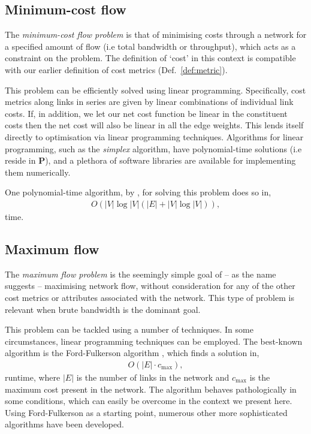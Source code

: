 %
%

\subsection{Minimum-cost flow} \label{sec:min_cost_flow_prob} 

The \textit{minimum-cost flow problem} \cite{???} is that of minimising costs through a network for a specified amount of flow (i.e total bandwidth or throughput), which acts as a constraint on the problem. The definition of `cost' in this context is compatible with our earlier definition of cost metrics (Def.~\ref{def:metric}).

This problem can be efficiently solved using linear programming. Specifically, cost metrics along links in series are given by linear combinations of individual link costs. If, in addition, we let our net cost function be linear in the constituent costs then the net cost will also be linear in all the edge weights. This lends itself directly to optimisation via linear programming techniques. Algorithms for linear programming, such as the \textit{simplex} algorithm, have polynomial-time solutions (i.e reside in \textbf{P}), and a plethora of software libraries are available for implementing them numerically.

One polynomial-time algorithm, by \cite{JAMES_B_ORLIN}, for solving this problem does so in, 
\begin{align}
	O(|V|\log |V|(|E|+|V|\log |V|)),
\end{align}
time.

%
%

\subsection{Maximum flow} \label{sec:max_flow_prob} 

The \textit{maximum flow problem} \cite{???} is the seemingly simple goal of -- as the name suggests -- maximising network flow, without consideration for any of the other cost metrics or attributes associated with the network. This type of problem is relevant when brute bandwidth is the dominant goal.

This problem can be tackled using a number of techniques. In some circumstances, linear programming techniques can be employed. The best-known algorithm is the Ford-Fulkerson algorithm \cite{???}, which finds a solution in,
\begin{align}
	O(|E|\cdot c_\mathrm{max}),
\end{align}
runtime, where $|E|$ is the number of links in the network and $c_\mathrm{max}$ is the maximum cost present in the network. The algorithm behaves pathologically in some conditions, which can easily be overcome in the context we present here. Using Ford-Fulkerson as a starting point, numerous other more sophisticated algorithms have been developed.

